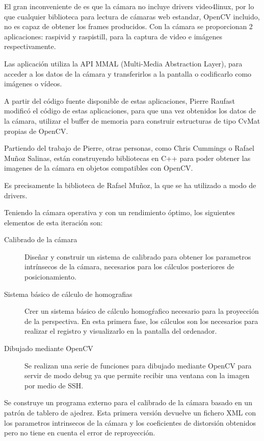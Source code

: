 El gran inconveniente de es que la cámara no incluye drivers video4linux, por lo que cualquier biblioteca para lectura de cámaras web estandar, OpenCV incluido, no es capaz de obtener los frames producidos. Con la cámara se proporcionan 2 aplicaciones: raspivid y raspistill, para la captura de video e imágenes respectivamente.

Las aplicación utiliza la API MMAL (Multi-Media Abstraction Layer), para acceder a los datos de la cámara y transferirlos a la pantalla o codificarlo como imágenes o vídeos.

A partir del código fuente disponible de estas aplicaciones, Pierre Raufast modificó el código de estas aplicaciones, para que una vez obtenidos los datos de la cámara, utilizar el buffer de memoria para construir estructuras de tipo CvMat propias de OpenCV.

Partiendo del trabajo de Pierre, otras personas, como Chris Cummings o Rafael Muñoz Salinas, están construyendo bibliotecas en C++ para poder obtener las imagenes de la cámara en objetos compatibles con OpenCV.

Es precisamente la biblioteca de Rafael Muñoz, la que se ha utilizado a modo de drivers. 

Teniendo la cámara operativa y con un rendimiento óptimo, los siguientes elementos de esta iteración son:
\begin{description}
\item [Calibrado de la cámara] Diseñar y construir un sistema de calibrado para obtener los parametros intrínsecos de la cámara, necesarios para los cálculos posteriores de posicionamiento.
\item [Sistema básico de cálculo de homografias] Crer un sistema básico de cálculo homogŕafico necesario para la proyección de la perspectiva. En esta primera fase, los cálculos son los necesarios para realizar el registro y visualizarlo en la pantalla del ordenador.
\item [Dibujado mediante OpenCV] Se realizan una serie de funciones para dibujado mediante OpenCV para servir de modo debug ya que permite recibir una ventana con la imagen por medio de SSH.
\end{description}

Se construye un programa externo para el calibrado de la cámara basado en un patrón de tablero de ajedrez. Esta primera versión devuelve un fichero XML con los parametros intrinsecos de la cámara y los coeficientes de distorsión obtenidos pero no tiene en cuenta el error de reproyección.

